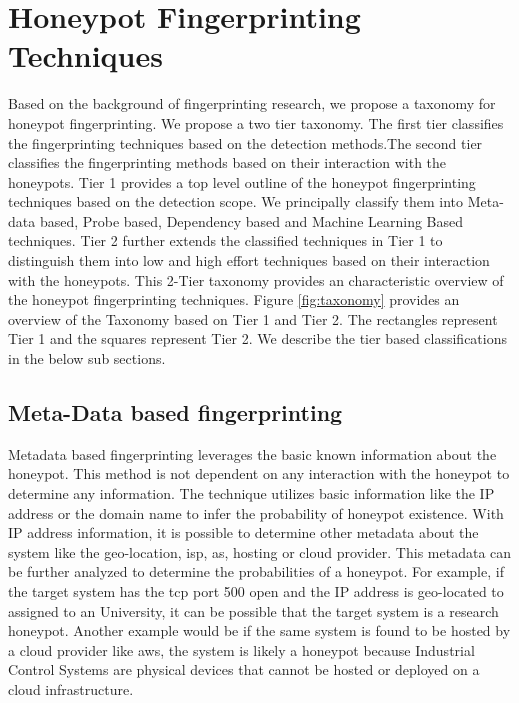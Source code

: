\section{Honeypot Fingerprinting Techniques}
\label{sec:hft}



Based on the background of fingerprinting research, we propose a taxonomy for honeypot fingerprinting. 
We propose a two tier taxonomy. The first tier classifies the fingerprinting techniques based on the detection methods.The second tier classifies the fingerprinting methods based on their interaction with the honeypots.
Tier 1 provides a top level outline of the honeypot fingerprinting techniques based on the detection scope. We principally classify them into Meta-data based, Probe based, Dependency based and Machine Learning Based techniques. Tier 2 further extends the classified techniques in Tier 1 to distinguish them into low and high effort techniques based on their interaction with the honeypots. This 2-Tier taxonomy provides an characteristic overview of the honeypot fingerprinting techniques. Figure \ref{fig:taxonomy} provides an overview of the Taxonomy based on Tier 1 and Tier 2. The rectangles represent Tier 1 and the squares represent Tier 2. We describe the tier based classifications in the below sub sections. 


\subsection{Meta-Data based fingerprinting}
Metadata based fingerprinting leverages the basic known information about the honeypot. This method is  not dependent on any interaction with the honeypot to determine any information. The technique utilizes basic information like the IP address or the domain name to infer the probability of honeypot existence. With IP address information, it is possible to determine other metadata about the system like the geo-location, \acrshort{isp}, \acrshort{as}, hosting or cloud provider. This metadata can be further analyzed to determine the probabilities of a honeypot. For example, if the target system has the \acrshort{tcp} port 500 open and the IP address is geo-located to assigned to an University, it can be possible that the target system is a research honeypot. Another example would be if the same system is found to be hosted by a cloud provider like \acrshort{aws}, the system is likely a honeypot because Industrial Control Systems are physical devices that cannot be hosted or deployed on a cloud infrastructure.

